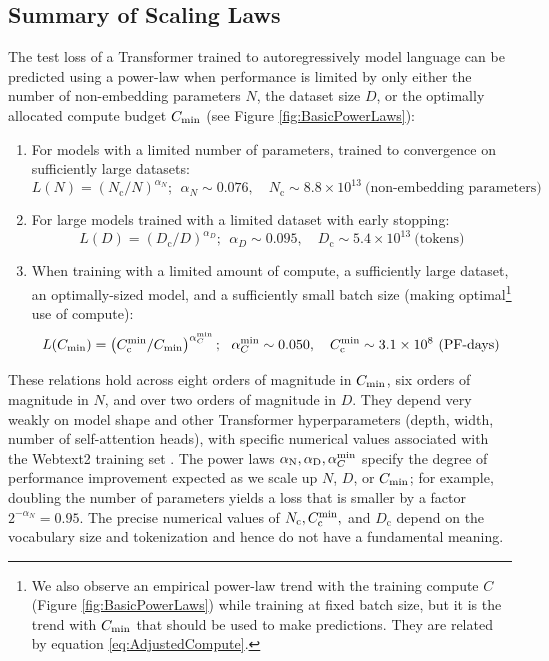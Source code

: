 \subsection{Summary of Scaling Laws}

The test loss of a Transformer trained to autoregressively model language can be predicted using a power-law  when performance is limited by only either the number of non-embedding parameters $N$, the dataset size $D$, or the optimally allocated compute budget $C_{\rm min}$ (see Figure \ref{fig:BasicPowerLaws}):

\begin{enumerate}

\item For models with a limited number of parameters, trained to convergence on sufficiently large datasets:
\begin{equation} L(N) = \left(N_{\mathrm{c}}/N\right)^{\alpha_N};~~ \alpha_N \sim 0.076, \quad N_{\mathrm{c}} \sim 8.8 \times 10^{13}~\text{(non-embedding parameters)} \label{eq:crit_n} \end{equation}
\item For large models trained with a limited dataset with early stopping:
\begin{equation} L(D) = \left(D_{\mathrm{c}}/D\right)^{\alpha_D};~~ \alpha_D \sim 0.095, \quad D_{\mathrm{c}} \sim 5.4 \times 10^{13}~\text{(tokens)} \label{eq:crit_d} \end{equation}
\item When training with a limited amount of compute, a sufficiently large dataset, an optimally-sized model, and a sufficiently small batch size (making optimal\footnote{We also observe an empirical power-law trend with the training compute $C$ (Figure \ref{fig:BasicPowerLaws}) while training at fixed batch size, but it is the trend with $C_{\rm min}$ that should be used to make predictions.  They are related by equation \eqref{eq:AdjustedCompute}. } use of compute):
\begin{equation} L(C_{\rm min}) = \left(C_{\mathrm{c}}^{\rm min} / C_{\rm min}\right)^{\alpha_C^{\rm min}};~~ \alpha_C^{\rm min} \sim 0.050, \quad C_{\mathrm{c}}^{\rm min} \sim 3.1 \times 10^{8}~\text{(PF-days)} \label{eq:crit_c} \end{equation}
\end{enumerate}

These relations hold across eight orders of magnitude in $C_{\rm min}$, six orders of magnitude in $N$, and over two orders of magnitude in $D$.  They depend very weakly on model shape and other Transformer hyperparameters (depth, width, number of self-attention heads), with specific numerical values associated with the Webtext2 training set \cite{radford2019language}.   The power laws $\alpha_{\rm N}, \alpha_{\rm D}, \alpha_{C}^{\rm min}$ specify the degree of performance improvement expected as we scale up $N$, $D$, or $C_{\rm min}$; for example, doubling the number of parameters yields a loss that is smaller by a factor $2^{-\alpha_N}=0.95$. The precise numerical values of $N_{\mathrm{c}}, C_{\rm c}^{\rm min},$ and $D_{\mathrm{c}}$ depend on the vocabulary size and tokenization and hence do not have a fundamental meaning.  

